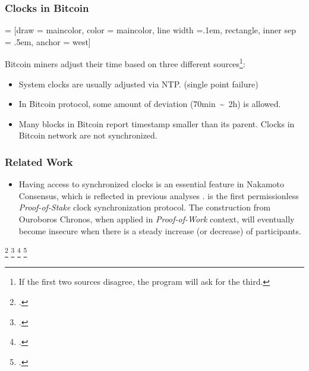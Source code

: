 \begin{frame}
    \frametitle{Clocks in Bitcoin}

     = [draw = maincolor, color = maincolor, line width =.1em, rectangle, inner sep = .5em, anchor = west]

    Bitcoin miners adjust their time based on three different sources\footnote{\insertfootnotemark If the first two sources disagree, the program will ask for the third.}:

    \begin{center}
    \end{center}

    \begin{itemize}
        \item<2-> System clocks are usually adjusted via NTP. (single point failure)
        \item<3-> In Bitcoin protocol, some amount of deviation (70min~\textasciitilde~2h) is allowed.
        \item<4-> Many blocks in Bitcoin report timestamp smaller than its parent.
             Clocks in Bitcoin network are not synchronized.
    \end{itemize}
\end{frame}

\begin{frame}
    \frametitle{Related Work}

    \begin{itemize}
        \item<1-> Having access to synchronized clocks is an essential feature in Nakamoto Consensus, which is reflected in previous analyses \cite{GKL15,DBLP:conf/eurocrypt/PassSS17,GKL17,bitcoin-uc-analysis}.
              \cite{ouroboros-chronos} is the first permissionless \emph{Proof-of-Stake} clock synchronization protocol.
             The construction from Ouroboros Chronos, when applied in \emph{Proof-of-Work} context, will eventually become insecure when there is a steady increase (or decrease) of participants.
    \end{itemize}

    \footcite{GKL15}
    \footcite{DBLP:conf/eurocrypt/PassSS17}
    \footcite{GKL17}
    \footcite{bitcoin-uc-analysis}
\end{frame}

